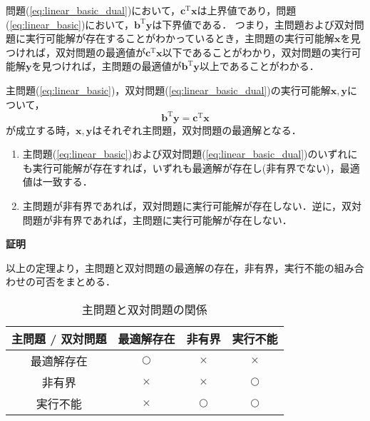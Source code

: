 \documentclass{jsreport}
\begin{document}
問題(\ref{eq:linear_basic_dual})において，$\bm{c}^{\mathrm{T}}\bm{x}$は上界値であり，問題(\ref{eq:linear_basic})において，$\bm{b}^{\mathrm{T}}\bm{y}$は下界値である．
つまり，主問題および双対問題に実行可能解が存在することがわかっているとき，主問題の実行可能解$\bm{x}$を見つければ，双対問題の最適値が$\bm{c}^{\mathrm{T}}\bm{x}$以下であることがわかり，双対問題の実行可能解$\bm{y}$を見つければ，主問題の最適値が$\bm{b}^{\mathrm{T}}\bm{y}$以上であることがわかる．

\begin{coro}
  主問題(\ref{eq:linear_basic})，双対問題(\ref{eq:linear_basic_dual})の実行可能解$\bm{x}, \bm{y}$について，
  \begin{equation}\label{eq:coro_dual}
    \bm{b}^{\mathrm{T}}\bm{y} = \bm{c}^{\mathrm{T}}\bm{x}
  \end{equation}
  が成立する時，$\bm{x}, \bm{y}$はそれぞれ主問題，双対問題の最適解となる．
\end{coro}

\begin{theo}
  \begin{enumerate}
    \item 主問題(\ref{eq:linear_basic})および双対問題(\ref{eq:linear_basic_dual})のいずれにも実行可能解が存在すれば，いずれも最適解が存在し(非有界でない)，最適値は一致する．
    \item 主問題が非有界であれば，双対問題に実行可能解が存在しない．逆に，双対問題が非有界であれば，主問題に実行可能解が存在しない．
  \end{enumerate}
\end{theo}
\textbf{証明}






以上の定理より，主問題と双対問題の最適解の存在，非有界，実行不能の組み合わせの可否をまとめる．
\begin{table}[htb]
  \centering
    \caption{主問題と双対問題の関係}
    \begin{tabular}{|c|c|c|c|}\hline
      主問題 / 双対問題 & 最適解存在 & 非有界 & 実行不能  \\ \hline
      最適解存在 & $\bigcirc$ & $\times$ & $\times$ \\ \hline
      非有界 & $\times$ & $\times$ & $\bigcirc$ \\ \hline
      実行不能 & $\times$ & $\bigcirc$ & $\bigcirc$ \\ \hline
    \end{tabular}
    \label{tab:exists_opt}
\end{table}
\end{document}
